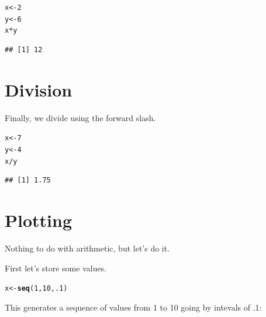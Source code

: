 \documentclass{article}\usepackage[]{graphicx}\usepackage[]{color}
\makeatletter
\newcommand{\hlnum}[1]{\textcolor[rgb]{0.686,0.059,0.569}{#1}}%
\newcommand{\hlopt}[1]{\textcolor[rgb]{0,0,0}{#1}}%
\newcommand{\hlstd}[1]{\textcolor[rgb]{0.345,0.345,0.345}{#1}}%
\newcommand{\hlkwb}[1]{\textcolor[rgb]{0.69,0.353,0.396}{#1}}%
\newcommand{\hlkwd}[1]{\textcolor[rgb]{0.737,0.353,0.396}{\textbf{#1}}}%
\newenvironment{kframe}{%
 \def\at@end@of@kframe{}%
 \ifinner\ifhmode%
  \def\at@end@of@kframe{\end{minipage}}%
  \begin{minipage}{\columnwidth}%
 \fi\fi%
 \def\FrameCommand##1{\hskip\@totalleftmargin \hskip-\fboxsep
 \colorbox{shadecolor}{##1}\hskip-\fboxsep
     \hskip-\linewidth \hskip-\@totalleftmargin \hskip\columnwidth}%
 \MakeFramed {\advance\hsize-\width
   \@totalleftmargin\z@ \linewidth\hsize
   \@setminipage}}%
 {\par\unskip\endMakeFramed%
 \at@end@of@kframe}
\newenvironment{knitrout}{}{} %
\makeatother
\begin{document}
\begin{knitrout}
\color{fgcolor}\begin{kframe}
\begin{alltt}
\hlstd{x}\hlkwb{<-}\hlnum{2}
\hlstd{y}\hlkwb{<-}\hlnum{6}
\hlstd{x}\hlopt{*}\hlstd{y}
\end{alltt}
\begin{verbatim}
## [1] 12
\end{verbatim}
\end{kframe}
\end{knitrout}

\section{Division}
Finally, we divide using the forward slash.
\begin{knitrout}
\color{fgcolor}\begin{kframe}
\begin{alltt}
\hlstd{x}\hlkwb{<-}\hlnum{7}
\hlstd{y}\hlkwb{<-}\hlnum{4}
\hlstd{x}\hlopt{/}\hlstd{y}
\end{alltt}
\begin{verbatim}
## [1] 1.75
\end{verbatim}
\end{kframe}
\end{knitrout}

\section{Plotting}
Nothing to do with arithmetic, but let's do it.

First let's store some values.
\begin{knitrout}
\color{fgcolor}\begin{kframe}
\begin{alltt}
\hlstd{x}\hlkwb{<-}\hlkwd{seq}\hlstd{(}\hlnum{1}\hlstd{,}\hlnum{10}\hlstd{,}\hlnum{.1}\hlstd{)}
\end{alltt}
\end{kframe}
\end{knitrout}

\noindent This generates a sequence of values from 1 to 10 going by intevals of .1:
\end{document}

